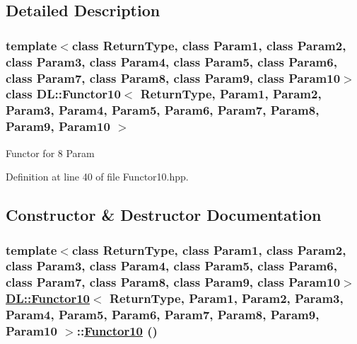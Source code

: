 \subsection{Detailed Description}
\subsubsection*{template$<$class Return\-Type, class Param1, class Param2, class Param3, class Param4, class Param5, class Param6, class Param7, class Param8, class Param9, class Param10$>$ class DL::Functor10$<$ Return\-Type, Param1, Param2, Param3, Param4, Param5, Param6, Param7, Param8, Param9, Param10 $>$}

Functor for 8 Param



Definition at line 40 of file Functor10.hpp.

\subsection{Constructor \& Destructor Documentation}
\hypertarget{classDL_1_1Functor10_d0}{
\subsubsection[Functor10]{\setlength{\rightskip}{0pt plus 5cm}template$<$class Return\-Type, class Param1, class Param2, class Param3, class Param4, class Param5, class Param6, class Param7, class Param8, class Param9, class Param10$>$ \hyperlink{classDL_1_1Functor10}{DL::Functor10}$<$ Return\-Type, Param1, Param2, Param3, Param4, Param5, Param6, Param7, Param8, Param9, Param10 $>$::\hyperlink{classDL_1_1Functor10}{Functor10} ()}}
\label{classDL_1_1Functor10_d0}




